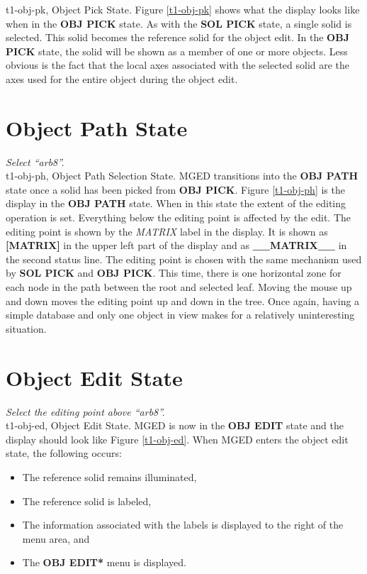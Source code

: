 \mfig t1-obj-pk, Object Pick State.
Figure \ref{t1-obj-pk} shows what the display looks like when in the
{\bf OBJ PICK} state. As with the {\bf SOL PICK} state, a single solid is
selected.  This solid becomes the reference solid for the object edit.
In the {\bf OBJ PICK} state, the solid will be shown
as a member of one or more objects.  Less obvious is the fact that the
local axes associated with the selected solid are the axes used for the
entire object during the object edit.

\section{Object Path State}

\noindent
{\em Select ``arb8''.}\\

\mfig t1-obj-ph, Object Path Selection State.
MGED transitions into the {\bf OBJ PATH} state once a solid has been
picked from {\bf OBJ PICK}. Figure \ref{t1-obj-ph} is the display in
the {\bf OBJ PATH} state.  When in this state the extent of the editing
operation is set.  Everything below the editing point is affected by the
edit.  The editing point is shown by the {\sl MATRIX} label in the
display.  It is shown as {\bf [MATRIX]} in the upper left part of the
display and as {\bf \_\_MATRIX\_\_} in the second status line.  The editing
point is chosen with the same mechanism used by {\bf SOL PICK} and
{\bf OBJ PICK}.  This time, there is one horizontal zone for each node in
the path between the root and selected leaf.  Moving the mouse up and down
moves the editing point up and down in the tree.  Once again, having a
simple database and only one object in view makes for a relatively
uninteresting situation.

\section{Object Edit State}

\noindent
{\em Select the editing point above ``arb8''.}\\

\mfig t1-obj-ed, Object Edit State.
MGED is now in the {\bf OBJ EDIT} state and the display should look like
Figure \ref{t1-obj-ed}.
When MGED enters the object edit state, the following occurs:
\begin{itemize}
\item The reference solid remains illuminated,
\item The reference solid is labeled,
\item The information associated with the labels is displayed to the right
of the menu area, and 
\item The {\bf *OBJ EDIT*} menu is displayed.
\end{itemize}

